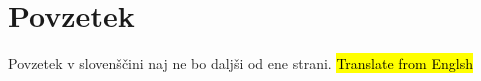 % 
\chapter*{Povzetek}

Povzetek v slovenščini naj ne bo daljši od ene strani. 
\hl{Translate from Englsh}
